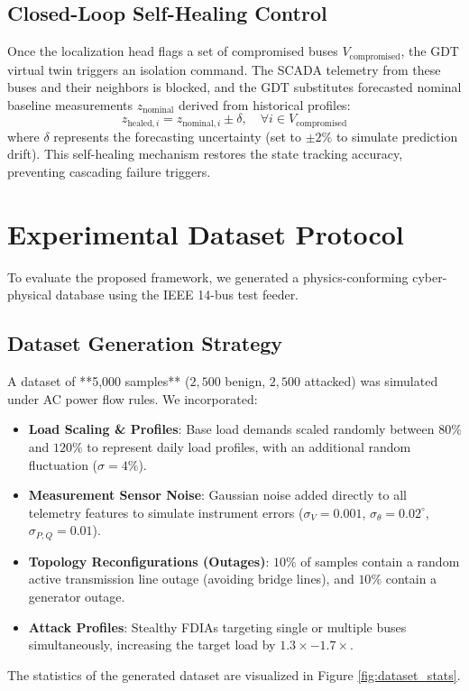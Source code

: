 \documentclass[12pt,a4paper]{report}
\begin{document}
\section{Closed-Loop Self-Healing Control}
Once the localization head flags a set of compromised buses $V_{\text{compromised}}$, the GDT virtual twin triggers an isolation command. The SCADA telemetry from these buses and their neighbors is blocked, and the GDT substitutes forecasted nominal baseline measurements $z_{\text{nominal}}$ derived from historical profiles:
\begin{equation}
z_{\text{healed}, i} = z_{\text{nominal}, i} \pm \delta, \quad \forall i \in V_{\text{compromised}}
\end{equation}
where $\delta$ represents the forecasting uncertainty (set to $\pm 2\%$ to simulate prediction drift). This self-healing mechanism restores the state tracking accuracy, preventing cascading failure triggers.

\chapter{Experimental Dataset Protocol}
To evaluate the proposed framework, we generated a physics-conforming cyber-physical database using the IEEE 14-bus test feeder. 

\section{Dataset Generation Strategy}
A dataset of **5,000 samples** ($2,500$ benign, $2,500$ attacked) was simulated under AC power flow rules. We incorporated:
\begin{itemize}
    \item \textbf{Load Scaling \& Profiles}: Base load demands scaled randomly between $80\%$ and $120\%$ to represent daily load profiles, with an additional random fluctuation ($\sigma = 4\%$).
    \item \textbf{Measurement Sensor Noise}: Gaussian noise added directly to all telemetry features to simulate instrument errors ($\sigma_{V}=0.001$, $\sigma_{\theta}=0.02^\circ$, $\sigma_{P,Q}=0.01$).
    \item \textbf{Topology Reconfigurations (Outages)}: $10\%$ of samples contain a random active transmission line outage (avoiding bridge lines), and $10\%$ contain a generator outage.
    \item \textbf{Attack Profiles}: Stealthy FDIAs targeting single or multiple buses simultaneously, increasing the target load by $1.3\times - 1.7\times$.
\end{itemize}
The statistics of the generated dataset are visualized in Figure \ref{fig:dataset_stats}.
\end{document}
